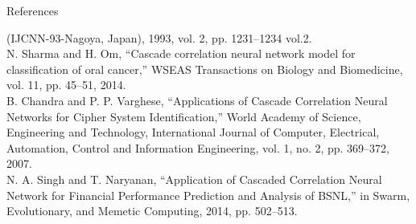 \documentclass{beamer}
\begin{document}
\begin{frame}[allowframebreaks, t]{References}
\begin{thebibliography}{99}
    (IJCNN-93-Nagoya, Japan), 1993, vol. 2, pp. 1231–1234 vol.2. \\
    \bibitem{} N. Sharma and H. Om, “Cascade correlation neural network model for
    classification of oral cancer,” WSEAS Transactions on Biology and
    Biomedicine, vol. 11, pp. 45–51, 2014. \\
    \bibitem{} B. Chandra and P. P. Varghese, “Applications of Cascade Correlation
    Neural Networks for Cipher System Identification,” World Academy of Science,
    Engineering and Technology, International Journal of Computer, Electrical,
    Automation, Control and Information Engineering, vol. 1, no. 2, pp. 369–372,
    2007. \\
    \bibitem{} N. A. Singh and T. Naryanan, “Application of Cascaded Correlation Neural
    Network for Financial Performance Prediction and Analysis of BSNL,” in
    Swarm, Evolutionary, and Memetic Computing, 2014, pp. 502–513. \\

    \end{thebibliography}
  \end{frame}
\end{document}

